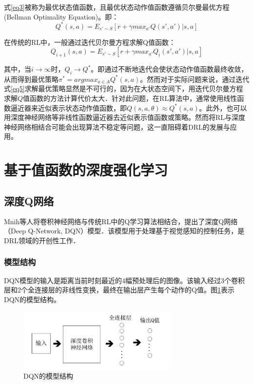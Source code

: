 \documentclass[bachelor]{thesis-uestc}
\begin{document}
	式\ref{eq3}被称为最优状态值函数，且最优状态动作值函数遵循贝尔曼最优方程(Bellman Optimality Equation)。即：
	\begin{equation}
	\label{eq4}
	Q^*(s,a)=E_{s'\sim S}[r+\gamma max_{a'}Q(s',a')|s,a]
	\end{equation}
	
	在传统的RL中，一般通过迭代贝尔曼方程求解Q值函数：
	\begin{equation}
	\label{eq5}
	Q_{i+1}(s,a)=E_{s'\sim S}[r+\gamma max_{a'}Q_i(s',a')|s,a]
	\end{equation}
	
	其中，当$i\rightarrow\infty$时，$Q_i\rightarrow Q^*$。即通过不断地迭代会使状态动作值函数最终收敛，从而得到最优策略$\pi^*=argmax_{a\in A}Q^*(s,a)$。然而对于实际问题来说，通过迭代式\ref{eq5}求解最优策略显然是不可行的，因为在大状态空间下，用迭代贝尔曼方程求解$Q$值函数的方法计算代价太大．针对此问题，在RL算法中，通常使用线性函数逼近器来近似表示状态动作值函数，即$Q(s,a,\theta)\approx Q^*(s,a)$。此外，也可以用深度神经网络等非线性函数逼近器去近似表示值函数或策略。然而将RL与深度神经网络相结合可能会出现算法不稳定等问题，这一直阻碍着DRL的发展与应用。
	
	\section{基于值函数的深度强化学习}
	\subsection{深度Q网络}
	Mnih等人将卷积神经网络与传统RL中的Q学习算法相结合，提出了深度Q网络（Deep Q-Network, DQN）模型．该模型用于处理基于视觉感知的控制任务，是DRL领域的开创性工作．
	
	\subsubsection{模型结构}
	DQN模型的输入是距离当前时刻最近的4幅预处理后的图像。该输入经过3个卷积层和2个全连接层的非线性变换，最终在输出层产生每个动作的Q值。图\ref{fg1}表示DQN的模型结构。
	\begin{figure}
		\includegraphics[width=8cm]{./pic/fg1.jpg}
		\caption{DQN的模型结构}
		\label{fg1}
	\end{figure}
	
\end{document}
